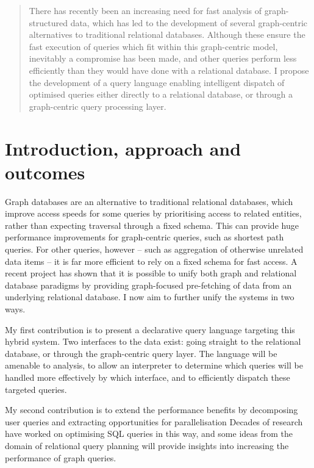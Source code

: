 \documentclass[11pt]{article}
\begin{document}
\begin{abstract}


There has recently been an increasing need for fast analysis of 
graph-structured data, which has led to the development of several graph-centric
alternatives to traditional relational databases. Although these ensure the
fast execution of queries which fit within this graph-centric model,
inevitably a compromise has been made, and other queries perform less
efficiently than they would have done with a relational database. I propose
the development of a query language enabling intelligent dispatch of optimised
queries either directly to a relational database, or through a graph-centric query processing
layer.

\end{abstract}

\section{Introduction, approach and outcomes}

Graph databases are an alternative to traditional relational databases, which
improve access speeds for some queries by prioritising access to related
entities, rather than expecting traversal through a fixed schema. This can
provide huge performance improvements for graph-centric queries, such as
shortest path queries. For other queries, however -- such as aggregation of
otherwise unrelated data items -- it is far more efficient to rely on a fixed
schema for fast access. A recent project\cite{crackle} has shown that it is
possible to unify both graph and relational database paradigms by providing
graph-focused pre-fetching of data from an underlying relational database.  I
now aim to further unify the systems in two ways.

My first contribution is to present a declarative query language 
targeting this hybrid system. Two interfaces to the data exist: going
straight to the relational database, or through the graph-centric query
layer. The language will be amenable to analysis, to
allow an interpreter to determine which queries will be 
handled more effectively by which interface, and to efficiently 
dispatch these targeted queries.

My second contribution is to extend the performance benefits
by decomposing
user queries and extracting opportunities for parallelisation
Decades of research have worked on
optimising SQL queries in this way, and some ideas from the domain of relational
query planning will provide insights into increasing the performance of graph
queries.
\end{document}
